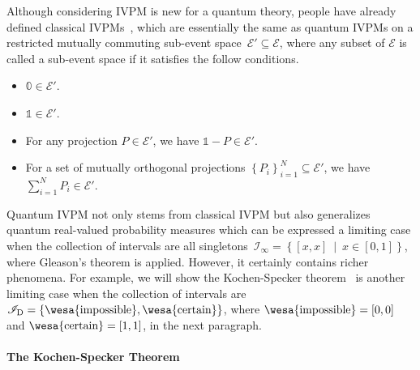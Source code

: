 \documentclass[english,reprint, aps, prl,superscriptaddress, showpacs,
showkeys, longbibliography, amsmath, amssymb]{revtex4-1}
\theoremstyle{plain}
\theoremstyle{definition}
\newcommand{\events}{\ensuremath{\mathcal{E}}}
\newcommand{\imposs}{{\text{\wesa{impossible}}}}
\newcommand{\necess}{{\text{\wesa{certain}}}}
\newcommand{\set}[2]{\ensuremath{\left\{ {#1}~\middle|~{#2}\right\} }}
\begin{document}
Although considering IVPM is new for a quantum theory, people have
already defined classical IVPMs~\cite{JamisonLodwick2004}, which
are essentially the same as quantum IVPMs on a restricted mutually
commuting sub-event space~$\events'\subseteq\events$, where any
subset of $\events$ is called a sub-event space if it satisfies the
follow conditions.
\begin{itemize}
\item $\mathbb{0}\in\events'$.
\item $\mathbb{1}\in\events'$.
\item For any projection $P\in\events'$, we have $\mathbb{1}-P\in\events'$.
\item For a set of mutually orthogonal projections $\left\{ P_{i}\right\} _{i=1}^{N}\subseteq\events'$,
we have $\sum_{i=1}^{N}P_{i}\in\events'$.
\end{itemize}
Quantum IVPM not only stems from classical IVPM but also generalizes
quantum real-valued probability measures which can be expressed a
limiting case when the collection of intervals are 
all singletons~$\mathscr{I}_{\infty}=\set{\left[x,x\right]}{x\in\left[0,1\right]}$,
where Gleason's theorem is applied. However, it certainly contains
richer phenomena. For example, we will show the 
Kochen-Specker theorem~\cite{kochenspecker1967,peres1995quantum,Redhead1987-REDINA}
is another limiting case when the collection of intervals are 
$\mathscr{I}_{\mathrm{D}}=\left\{ \imposs,\necess\right\} $,
where $\imposs=\left[0,0\right]$ and $\necess=\left[1,1\right]$,
in the next paragraph.

\paragraph{The Kochen-Specker Theorem}
\end{document}
